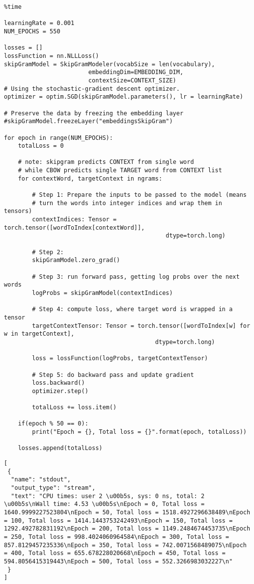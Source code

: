 \documentclass[
]{article}
\begin{document}
\begin{verbatim}
%time

learningRate = 0.001
NUM_EPOCHS = 550

losses = []
lossFunction = nn.NLLLoss()
skipGramModel = SkipGramModeler(vocabSize = len(vocabulary),
                        embeddingDim=EMBEDDING_DIM,
                        contextSize=CONTEXT_SIZE)
# Using the stochastic-gradient descent optimizer.
optimizer = optim.SGD(skipGramModel.parameters(), lr = learningRate)

# Preserve the data by freezing the embedding layer
#skipGramModel.freezeLayer("embeddingsSkipGram")

for epoch in range(NUM_EPOCHS):
    totalLoss = 0

    # note: skipgram predicts CONTEXT from single word
    # while CBOW predicts single TARGET word from CONTEXT list
    for contextWord, targetContext in ngrams:

        # Step 1: Prepare the inputs to be passed to the model (means
        # turn the words into integer indices and wrap them in tensors)
        contextIndices: Tensor = torch.tensor([wordToIndex[contextWord]],
                                              dtype=torch.long)

        # Step 2:
        skipGramModel.zero_grad()

        # Step 3: run forward pass, getting log probs over the next words
        logProbs = skipGramModel(contextIndices)

        # Step 4: compute loss, where target word is wrapped in a tensor
        targetContextTensor: Tensor = torch.tensor([wordToIndex[w] for w in targetContext],
                                           dtype=torch.long)

        loss = lossFunction(logProbs, targetContextTensor)

        # Step 5: do backward pass and update gradient
        loss.backward()
        optimizer.step()

        totalLoss += loss.item()

    if(epoch % 50 == 0):
        print("Epoch = {}, Total loss = {}".format(epoch, totalLoss))

    losses.append(totalLoss)
\end{verbatim}

\begin{verbatim}
[
 {
  "name": "stdout",
  "output_type": "stream",
  "text": "CPU times: user 2 \u00b5s, sys: 0 ns, total: 2 \u00b5s\nWall time: 4.53 \u00b5s\nEpoch = 0, Total loss = 1640.9999227523804\nEpoch = 50, Total loss = 1518.4927296638489\nEpoch = 100, Total loss = 1414.1443753242493\nEpoch = 150, Total loss = 1292.492782831192\nEpoch = 200, Total loss = 1149.2484674453735\nEpoch = 250, Total loss = 998.4024060964584\nEpoch = 300, Total loss = 857.8129457235336\nEpoch = 350, Total loss = 742.0071568489075\nEpoch = 400, Total loss = 655.678228020668\nEpoch = 450, Total loss = 594.8056415319443\nEpoch = 500, Total loss = 552.3266983032227\n"
 }
]
\end{verbatim}
\end{document}
